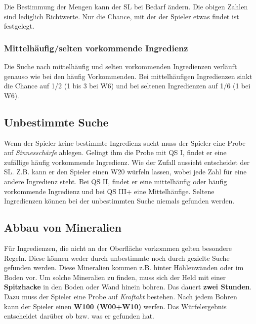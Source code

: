 Die Bestimmung der Mengen kann der SL bei Bedarf ändern. Die obigen Zahlen sind lediglich Richtwerte. Nur die Chance, mit der der Spieler etwas findet ist festgelegt.

\subsubsection{Mittelhäufig/selten vorkommende Ingredienz}
Die Suche nach mittelhäufig und selten vorkommenden Ingredienzen verläuft genauso wie bei den häufig Vorkommenden. Bei mittelhäufigen Ingredienzen sinkt die Chance auf 1/2 (1 bis 3 bei W6) und bei seltenen Ingredienzen auf 1/6 (1 bei W6).

\subsection{Unbestimmte Suche}
Wenn der Spieler keine bestimmte Ingredienz sucht muss der Spieler eine Probe auf \textit{Sinnesschärfe} ablegen. Gelingt ihm die Probe mit QS I, findet er eine zufällige häufig vorkommende Ingredienz. Wie der Zufall aussieht entscheidet der SL. Z.B. kann er den Spieler einen W20 würfeln lassen, wobei jede Zahl für eine andere Ingredienz steht. Bei QS II, findet er eine mittelhäufig oder häufig vorkommende Ingredienz und bei QS III+ eine Mittelhäufige. Seltene Ingredienzen können bei der unbestimmten Suche niemals gefunden werden.

\subsection{Abbau von Mineralien}
\label{chap:abbau_von_mineralien}
Für Ingredienzen, die nicht an der Oberfläche vorkommen gelten besondere Regeln. Diese können weder durch unbestimmte noch durch gezielte Suche gefunden werden. Diese Mineralien kommen z.B. hinter Höhlenwänden oder im Boden vor. Um solche Mineralien zu finden, muss sich der Held mit einer \textbf{Spitzhacke} in den Boden oder Wand hinein bohren. Das dauert \textbf{zwei Stunden}. Dazu muss der Spieler eine Probe auf \textit{Kraftakt} bestehen. Nach jedem Bohren kann der Spieler einen \textbf{W100 (W00+W10)} werfen. Das Würfelergebnis entscheidet darüber ob bzw. was er gefunden hat.

